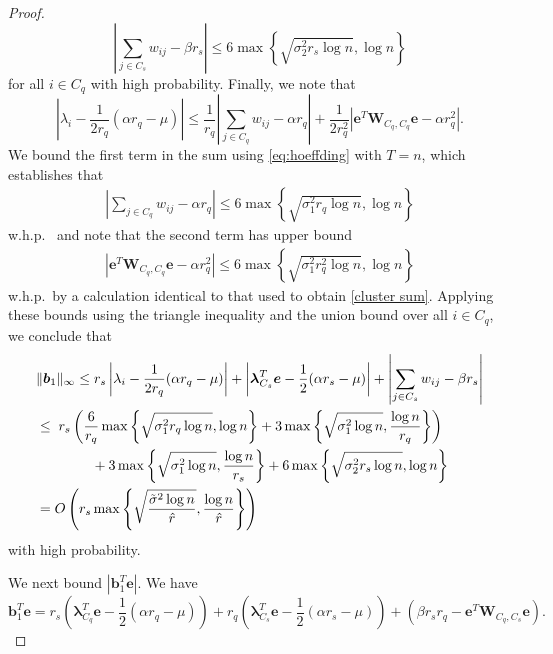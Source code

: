 \documentclass[twoside,11pt]{article}
\newcommand{\bs}{\boldsymbol}
\newcommand{\0}{\bs{0}}
\newcommand{\abs}[1]{\ensuremath{\left| #1  \right| }}
\newcommand{\rbra}[1]{\ensuremath{\left( #1 \right)}} %
\newcommand{\bra}[1]{\ensuremath{\left\{ #1 \right\}}} %
\begin{document}
{\begin{proof}
\begin{equation}
	\abs{ \sum_{j\in C_s} w_{ij} - \beta r_s }
		\le 6 \max \bra{ \sqrt{\sigma^2_2 r_s \log n}, \log n }
\end{equation}
for all $i \in C_q$ with high probability.
Finally, we note that
\begin{equation}
\label{eq:temp3}
\left|\lambda_i - \frac{1}{2r_q}(\alpha r_q - \mu)\right| \leq \frac{1}{r_q}\left|\sum_{j \in C_q} w_{ij} - \alpha r_q \right| + \frac{1}{2r_q^2}\left|\bs{e}^T \bs{W}_{C_q,C_q} \bs{e} - \alpha r_q^2\right|.
\end{equation}
We bound the first term in the sum using \eqref{eq:hoeffding} with $T=n$,
which establishes that
\begin{align*}
 \left|\sum_{j \in C_q} w_{ij}-\alpha r_q\right| 
 	\le 6 \max \bra{ \sqrt{\sigma^2_1 r_q \log n}, \log n }
\end{align*}
w.h.p.~
and note that the second term has upper bound
\begin{align*}
 \left| \bs{e}^T \bs{W}_{C_q,C_q} \bs{e} - \alpha r_q^2 \right|   
\le 6 \max \bra{\sqrt{\sigma_1^2 r_q^2 \log n}, \log n }
\end{align*}
w.h.p.~by a calculation identical to that used to obtain \eqref{cluster sum}.
Applying these bounds using the triangle inequality and the
union bound over all $i \in C_q$, we conclude that 
\begin{align}
&\|\bs{b}_1\|_{\infty} \leq r_s \left|\lambda_i -\frac{1}{2r_q}(\alpha r_q - \mu)\right| 
+ \left|\bs{\lambda}_{C_s}^T\bs{e} - \frac{1}{2}(\alpha r_s - \mu)\right| + \left|\sum_{j \in C_s} w_{ij} - \beta r_s\right| \notag\\
 & \leq  \;r_s \left(\frac{6}{r_q}\max \bra{ \sqrt{\sigma^2_1 r_q \log n}, \log n } + 3 \max\bra{ \sqrt{\sigma_1^2  \log n}, \frac{\log n}{r_q}} \right) \notag \\
& \hspace{0.55in} + 3  \max\bra{ \sqrt{\sigma_1^2  \log n}, \frac{\log n}{r_s}} 
+ 6 \max\bra{ \sqrt{\sigma_2^2  r_s \log n}, \log n}  \notag\\
 & =  O \rbra{ r_s \max \bra{  \sqrt{ \frac{ \tilde{\sigma}^2 \log n}{\hat{r}} }, \frac{ \log n}{\hat{r}} } } \label{eq:b1_inf_orig}
\end{align}
with high probability.

We next bound $\left|\bs{b}_1^T \bs{e}\right|$. We have
$$ \bs{b}_1^T \bs{e} = r_s \left(\bs{\lambda}_{C_q}^T \bs{e} - \frac{1}{2}\left(\alpha r_q - \mu\right)\right) + r_q \left(\bs{\lambda}_{C_s}^T \bs{e} - \frac{1}{2}\left(\alpha r_s - \mu\right)\right) + \left(\beta r_s r_q - \bs{e}^T \bs{W}_{C_q,C_s}\bs{e}\right).$$



\end{proof}}
\end{document}
